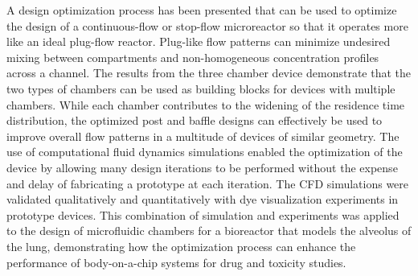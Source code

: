 A design optimization process has been presented that can be used
to optimize the design of a continuous-flow or stop-flow microreactor
so that it operates more like an ideal plug-flow reactor. Plug-like
flow patterns can minimize undesired mixing between compartments and
non-homogeneous concentration profiles across a channel. The results
from the three chamber device demonstrate that the two types of chambers
can be used as building blocks for devices with multiple chambers.
While each chamber contributes to the widening of the residence time
distribution, the optimized post and baffle designs can effectively
be used to improve overall flow patterns in a multitude of devices
of similar geometry. The use of computational fluid dynamics simulations
enabled the optimization of the device by allowing many design iterations
to be performed without the expense and delay of fabricating a prototype
at each iteration. The CFD simulations were validated qualitatively
and quantitatively with dye visualization experiments in prototype
devices. This combination of simulation and experiments was applied
to the design of microfluidic chambers for a bioreactor that models
the alveolus of the lung, demonstrating how the optimization process
can enhance the performance of body-on-a-chip systems for drug and
toxicity studies. 
